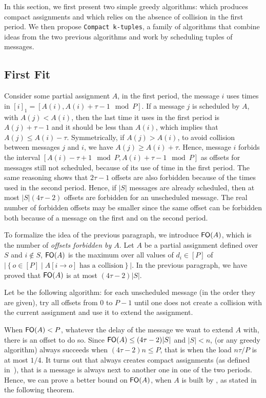\documentclass[pdflatex,sn-mathphys,iicol]{sn-jnl}%
\theoremstyle{thmstyleone}%
\theoremstyle{thmstyletwo}%
\theoremstyle{thmstylethree}%
\begin{document}
 In this section, we first present two simple greedy algorithms:
 \firstfit which produces compact assignments and \metaoffset which 
 relies on the absence of collision in the first period. We then propose \texttt{Compact k-tuples}, a family of algorithms that combine ideas from the two previous algorithms and work by scheduling tuples of messages.

\subsection{First Fit}

Consider some partial assignment $A$, in the first period, the message $i$ uses times in $[i]_1 = [A(i), A(i) + \tau -1 \mod P]$. If a message $j$ is scheduled by $A$, with $A(j) < A(i)$, then the last time it uses in the first period is $A(j)+\tau-1$ and it should be less than $A(i)$, which implies that $A(j) \leq A(i) - \tau$. Symmetrically, if $A(j) > A(i)$, to avoid collision between messages $j$ and $i$, we have $A(j) \geq A(i) + \tau$. Hence, message $i$ forbids the interval $[A(i) - \tau +1 \mod P, A(i) + \tau -1 \mod P]$ as offsets for messages still not scheduled, because of its use of time in the first period. The same reasoning shows that $2\tau -1$ offsets are also forbidden because of the times used in the second period. Hence, if $\lvert S\rvert $ messages are already scheduled, then at most $\lvert S\rvert(4\tau -2)$ offsets are forbidden for an unscheduled message. The real number of forbidden offsets may be smaller since the same offset can be forbidden both because of a message on the first and on the second period.

To formalize the idea of the previous paragraph, we introduce $\textsf{FO}(A)$, which is the number of \emph{offsets forbidden by $A$}. Let $A$ be a partial assignment defined over $S$ and $i\notin S$, $\textsf{FO}(A)$ is the maximum over all values of $d_i \in [P]$ of $\lvert\left\{ o \in [P] \mid A[i \rightarrow o] \text{ has a collision}\right\}\rvert$. In the previous paragraph, we have proved that $\textsf{FO}(A)$ is at most $(4 \tau -2)\lvert S\rvert$. 

Let \firstfit be the following algorithm:  for each unscheduled message (in the order they are given), try all offsets from $0$ to $P-1$ until one does not create a collision with the current assignment and use it to extend the assignment. 

When $\textsf{FO}(A) < P$, whatever the delay of the message we want to extend $A$ with, there is an offset to do so. Since $\textsf{FO}(A) \leq (4 \tau -2)\lvert S\rvert$ and $\lvert S\rvert < n$, \firstfit (or any greedy algorithm) always succeeds when $(4 \tau -2)n \leq P$, that is when the load $ n\tau /P$ is at most $1/4$.
It turns out that \firstfit always creates compact assignments (as defined in~\cite{bartharxiv2018deterministic}), that is a message is always next to another one in one of the two periods. Hence, we can prove a better bound on $\textsf{FO}(A)$, when $A$ is built by \firstfit, as stated in the following theorem.
\end{document}
